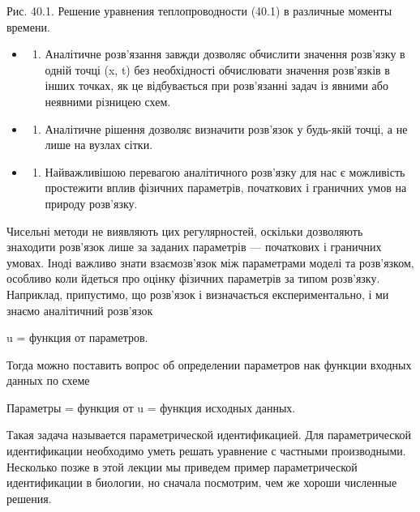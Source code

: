 \documentclass[
  ukrainian,
]{article}
\providecommand{\tightlist}{%
  \setlength{\itemsep}{0pt}\setlength{\parskip}{0pt}}
\begin{document}
Рис. 40.1. Решение уравнения теплопроводности (40.1) в различные моменты
времени.

\begin{itemize}
\tightlist
\item
  \begin{enumerate}
  \def\labelenumi{\arabic{enumi}.}
  \setcounter{enumi}{1}
  \tightlist
  \item
    Аналітичне розв'язання завжди дозволяє обчислити значення розв'язку
    в одній точці (x, t) без необхідності обчислювати значення
    розв'язків в інших точках, як це відбувається при розв'язанні задач
    із явними або неявними різницею схем.
  \end{enumerate}
\item
  \begin{enumerate}
  \def\labelenumi{\arabic{enumi}.}
  \setcounter{enumi}{2}
  \tightlist
  \item
    Аналітичне рішення дозволяє визначити розв'язок у будь-якій точці, а
    не лише на вузлах сітки.
  \end{enumerate}
\item
  \begin{enumerate}
  \def\labelenumi{\arabic{enumi}.}
  \setcounter{enumi}{3}
  \tightlist
  \item
    Найважливішою перевагою аналітичного розв'язку для нас є можливість
    простежити вплив фізичних параметрів, початкових і граничних умов на
    природу розв'язку.
  \end{enumerate}
\end{itemize}

Чисельні методи не виявляють цих регулярностей, оскільки дозволяють
знаходити розв'язок лише за заданих параметрів --- початкових і
граничних умовах. Іноді важливо знати взаємозв'язок між параметрами
моделі та розв'язком, особливо коли йдеться про оцінку фізичних
параметрів за типом розв'язку. Наприклад, припустимо, що розв'язок і
визначається експериментально, і ми знаємо аналітичний розв'язок

u = функция от параметров.

Тогда можно поставить вопрос об определении параметров нак функции
входных данных по схеме

Параметры = функция от u = функция исходных данных.

Такая задача называется параметрической идентификацией. Для
параметрической идентификации необходимо уметь решать уравнение с
частными производными. Несколько позже в этой лекции мы приведем пример
параметрической идентификации в биологии, но сначала посмотрим, чем же
хороши численные решения.
\end{document}
